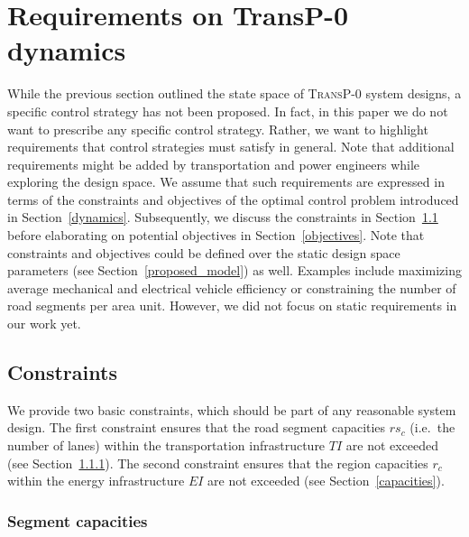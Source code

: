 \section{Requirements on \textbf{TransP-0} dynamics}
\label{requirements}

While the previous section outlined the state space of \textsc{TransP-0} system designs, a specific control strategy has not been proposed. In fact, in this paper we do not want to prescribe any specific control strategy. Rather, we want to highlight requirements that control strategies must satisfy in general. Note that additional requirements might be added by transportation and power engineers while exploring the design space. We assume that such requirements are expressed in terms of the constraints and objectives of the optimal control problem introduced in Section~\ref{dynamics}. Subsequently, we discuss the constraints in Section~\ref{constraints} before elaborating on potential objectives in Section~\ref{objectives}. Note that constraints and objectives could be defined over the static design space parameters (see Section~\ref{proposed_model}) as well. Examples include maximizing average mechanical and electrical vehicle efficiency or constraining the number of road segments per area unit. However, we did not focus on static requirements in our work yet.

\subsection{Constraints}
\label{constraints}

We provide two basic constraints, which should be part of any reasonable system design. The first constraint ensures that the road segment capacities $rs_c$ (i.e.\ the number of lanes) within the transportation infrastructure $TI$ are not exceeded (see Section~\ref{collisions}). The second constraint ensures that the region capacities $r_c$ within the energy infrastructure $EI$ are not exceeded (see Section~\ref{capacities}).

\subsubsection{Segment capacities}
\label{collisions}


